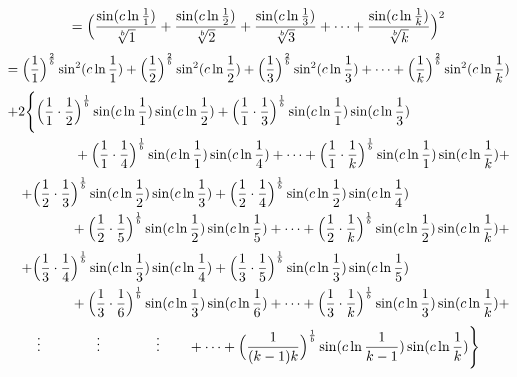 \documentclass{amsart}
\begin{document}
	\[ = \Bigl( \frac{\sin({c\ln \frac{1}{1}})}{\sqrt[b]{1}} + \frac{\sin({c\ln \frac{1}{2}})}{\sqrt[b]{2}} + \frac{\sin({c\ln \frac{1}{3}})}{\sqrt[b]{3}} + \dots + \frac{\sin({c\ln \frac{1}{k}})}{\sqrt[b]{k}} \Bigr)^2 \]
	\[ = \Bigl( \frac{1}{1} \Bigr)^{\frac2b}\sin^2({c \ln \frac{1}{1}}) + \Bigl( \frac{1}{2} \Bigr)^{\frac2b}\sin^2({c \ln \frac{1}{2}}) + \Bigl( \frac{1}{3} \Bigr)^{\frac2b}\sin^2({c \ln \frac{1}{3}}) + \dots + \Bigl( \frac{1}{k} \Bigr)^{\frac2b}\sin^2({c \ln \frac{1}{k}}) \]
	\[
	\begin{aligned}
		+2\Biggl\{ \Bigl( \frac{1}{1} \cdot \frac{1}{2}& \Bigr)^\frac1b \sin(c \ln \frac{1}{1}) \sin(c \ln \frac{1}{2}) + \Bigl( \frac{1}{1} \cdot \frac{1}{3} \Bigr)^\frac1b \sin(c \ln \frac{1}{1}) \sin(c \ln \frac{1}{3}) \\ 
		& + \Bigl( \frac{1}{1} \cdot \frac{1}{4} \Bigr)^\frac1b \sin(c \ln \frac{1}{1}) \sin(c \ln \frac{1}{4}) + \dots + \Bigl( \frac{1}{1} \cdot \frac{1}{k} \Bigr)^\frac1b \sin(c \ln \frac{1}{1}) \sin(c \ln \frac{1}{k}) + \\ 		
	\end{aligned}
	\]
	\[
	\begin{aligned}
		\quad + \Bigl( \frac{1}{2} \cdot \frac{1}{3}& \Bigr)^\frac1b \sin(c \ln \frac{1}{2}) \sin(c \ln \frac{1}{3}) + \Bigl( \frac{1}{2} \cdot \frac{1}{4} \Bigr)^\frac1b \sin(c \ln \frac{1}{2}) \sin(c \ln \frac{1}{4}) \\ 
		& + \Bigl( \frac{1}{2} \cdot \frac{1}{5} \Bigr)^\frac1b \sin(c \ln \frac{1}{2}) \sin(c \ln \frac{1}{5}) + \dots + \Bigl( \frac{1}{2} \cdot \frac{1}{k} \Bigr)^\frac1b \sin(c \ln \frac{1}{2}) \sin(c \ln \frac{1}{k}) + \\ 		
	\end{aligned}
	\]
	\[
	\begin{aligned}
		\quad + \Bigl( \frac{1}{3} \cdot \frac{1}{4}& \Bigr)^\frac1b \sin(c \ln \frac{1}{3}) \sin(c \ln \frac{1}{4}) + \Bigl( \frac{1}{3} \cdot \frac{1}{5} \Bigr)^\frac1b \sin(c \ln \frac{1}{3}) \sin(c \ln \frac{1}{5}) \\ 
		& + \Bigl( \frac{1}{3} \cdot \frac{1}{6} \Bigr)^\frac1b \sin(c \ln \frac{1}{3}) \sin(c \ln \frac{1}{6}) + \dots + \Bigl( \frac{1}{3} \cdot \frac{1}{k} \Bigr)^\frac1b \sin(c \ln \frac{1}{3}) \sin(c \ln \frac{1}{k}) + \\ 		
	\end{aligned}
	\]
	\[
	\begin{aligned}
		\vdots \qquad\qquad \vdots \qquad\qquad \vdots \qquad + \dots + \Bigl( \frac{1}{(k-1)k} \Bigr)^\frac1b \sin(c \ln \frac{1}{k-1}) \sin(c \ln \frac{1}{k}) \Biggr\}
	\end{aligned}
	\]
	
\end{document}
